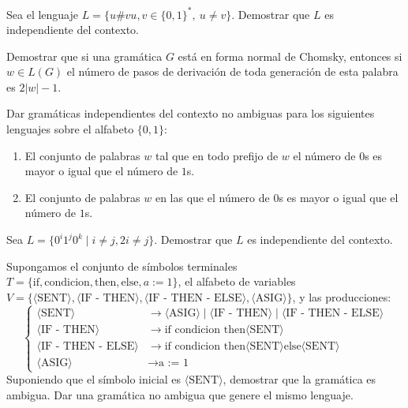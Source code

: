\begin{ejercicio}\label{ej:1.4.18}
    Sea el lenguaje $L = \{ u\#v u,v\in \{0,1\}^*,~u\neq v\}$. Demostrar que $L$ es independiente del contexto.
\end{ejercicio}

\begin{ejercicio}\label{ej:1.4.19}
    Demostrar que si una gramática $G$ está en forma normal de Chomsky, entonces si $w \in L(G)$ el número de pasos de derivación de toda generación de esta palabra es $2|w| - 1$.
\end{ejercicio}

\begin{ejercicio}\label{ej:1.4.20}
    Dar gramáticas independientes del contexto no ambiguas para los siguientes lenguajes sobre el alfabeto $\{ 0, 1 \}$:
    \begin{enumerate}
        \item El conjunto de palabras $w$ tal que en todo prefijo de $w$ el número de $0$s es mayor o igual que el número de $1$s.
        \item El conjunto de palabras $w$ en las que el número de $0$s es mayor o igual que el número de $1$s.
    \end{enumerate}
\end{ejercicio}

\begin{ejercicio}\label{ej:1.4.21}
    Sea $L = \{ 0^i 1^j 0^k \mid i \neq j, 2i \neq j \}$. Demostrar que $L$ es independiente del contexto.
\end{ejercicio}

\begin{ejercicio}\label{ej:1.4.22}
    Supongamos el conjunto de símbolos terminales $T = \{ \text{if}, \text{condicion}, \text{then}, \text{else}, a := 1 \}$, el alfabeto de variables $V = \{ \langle \text{SENT} \rangle, \langle \text{IF - THEN} \rangle, \langle \text{IF - THEN - ELSE} \rangle, \langle \text{ASIG} \rangle \}$, y las producciones:
    \begin{equation*}
        \left\{
            \begin{aligned}
                \langle \text{SENT} \rangle &\rightarrow \langle \text{ASIG} \rangle \mid \langle \text{IF - THEN} \rangle \mid \langle \text{IF - THEN - ELSE} \rangle\\
                \langle \text{IF - THEN} \rangle &\rightarrow \text{if condicion then} \langle \text{SENT} \rangle\\
                \langle \text{IF - THEN - ELSE} \rangle &\rightarrow \text{if condicion then} \langle \text{SENT} \rangle \text{else} \langle \text{SENT} \rangle\\
                \langle \text{ASIG} \rangle &\rightarrow \text{a := 1}
            \end{aligned}
        \right.
    \end{equation*}
    Suponiendo que el símbolo inicial es $\langle \text{SENT} \rangle$, demostrar que la gramática es ambigua. Dar una gramática no ambigua que genere el mismo lenguaje.
\end{ejercicio}


